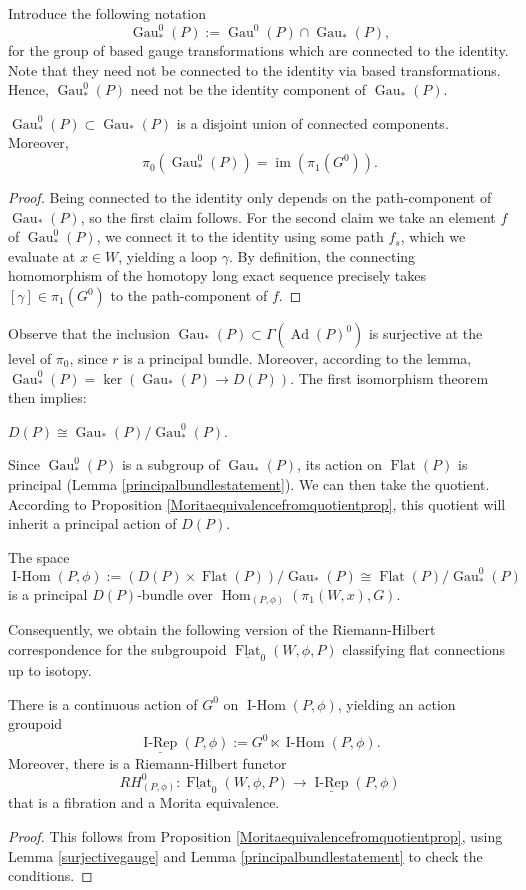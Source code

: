 \documentclass[10pt]{amsart}
\newcommand{\Hom}{\operatorname{Hom}}
\newcommand{\im}{\operatorname{im}}
\newcommand{\FlatCat}{{\underline{\operatorname{Flat}}}}
\newcommand{\FlatObj}{{\operatorname{Flat}}}
\newcommand{\IsotopyCat}{{\underline{\operatorname{I-Rep}}}}
\newcommand{\IsotopyObj}{{\operatorname{I-Hom}}}
\DeclareMathOperator{\Gau}{Gau}
\DeclareMathOperator{\Ad}{Ad}
\numberwithin{theoremalpha}{section}
\numberwithin{equation}{section}
\numberwithin{definition}{section}
\numberwithin{theorem}{section}
\numberwithin{proposition}{section}
\numberwithin{lemma}{section}
\numberwithin{example}{section}
\numberwithin{remark}{section}
\numberwithin{corollary}{section}
\numberwithin{question}{section}
\numberwithin{problem}{section}
\numberwithin{assumption}{section}
\theoremstyle{named}
\numberwithin{equation}{section}
\begin{document}
Introduce the following notation 
\[ \Gau_{*}^0(P) := \Gau^{0}(P) \cap \Gau_{*}(P), \]
for the group of based gauge transformations which are connected to the identity. Note that they need not be connected to the identity via based transformations. Hence, $\Gau_{*}^0(P)$ need not be the identity component of $\Gau_{*}(P)$. 
\begin{lemma}
$\Gau_{*}^0(P) \subset \Gau_{*}(P)$ is a disjoint union of connected components. Moreover,
\[  \pi_0(\Gau_{*}^0(P)) = \im(\pi_1(G^0)). \]
\end{lemma}
\begin{proof}
Being connected to the identity only depends on the path-component of $\Gau_{*}(P)$, so the first claim follows. For the second claim we take an element $f$ of $\Gau_{*}^0(P)$, we connect it to the identity using some path $f_s$, which we evaluate at $x \in W$, yielding a loop $\gamma$. By definition, the connecting homomorphism of the homotopy long exact sequence precisely takes $[\gamma] \in \pi_1(G^0)$ to the path-component of $f$.
\end{proof}

Observe that the inclusion $\Gau_{*}(P) \subset \Gamma(\Ad(P)^0)$ is surjective at the level of $\pi_0$, since $r$ is a principal bundle. Moreover, according to the lemma, $\Gau_{*}^0(P) = \ker(\Gau_{*}(P) \rightarrow D(P))$. The first isomorphism theorem then implies:
\begin{corollary}
$D(P) \cong \Gau_{*}(P)/\Gau_{*}^0(P).$ 
\end{corollary}

Since $\Gau_{*}^0(P)$ is a subgroup of $\Gau_{*}(P)$, its action on $\FlatObj(P)$ is principal (Lemma \ref{principalbundlestatement}). We can then take the quotient. According to Proposition \ref{Moritaequivalencefromquotientprop}, this quotient will inherit a principal action of $D(P)$. 
\begin{corollary} \label{cor:constructingH}
The space
\[ \IsotopyObj(P,\phi) := (D(P) \times \FlatObj(P))/\Gau_{*}(P) \cong \FlatObj(P)/\Gau_{*}^0(P) \]
is a principal $D(P)$-bundle over $\Hom_{(P,\phi)}(\pi_{1}(W, x), G)$.
\end{corollary}

Consequently, we obtain the following version of the Riemann-Hilbert correspondence for the subgroupoid $\FlatCat_{0}(W,\phi,P)$ classifying flat connections up to isotopy.
\begin{proposition} \label{prop:RHisotopy}
There is a continuous action of $G^0$ on $\IsotopyObj(P,\phi)$, yielding an action groupoid
\[ \IsotopyCat(P,\phi) := G^0 \ltimes \IsotopyObj(P,\phi). \]
Moreover, there is a Riemann-Hilbert functor
\[ RH^{0}_{(P,\phi)}: \FlatCat_{0}(W,\phi,P) \rightarrow \IsotopyCat(P,\phi) \]
that is a fibration and a Morita equivalence.
\end{proposition}
\begin{proof}
This follows from Proposition \ref{Moritaequivalencefromquotientprop}, using Lemma \ref{surjectivegauge} and Lemma \ref{principalbundlestatement} to check the conditions. 
\end{proof}
\end{document}
